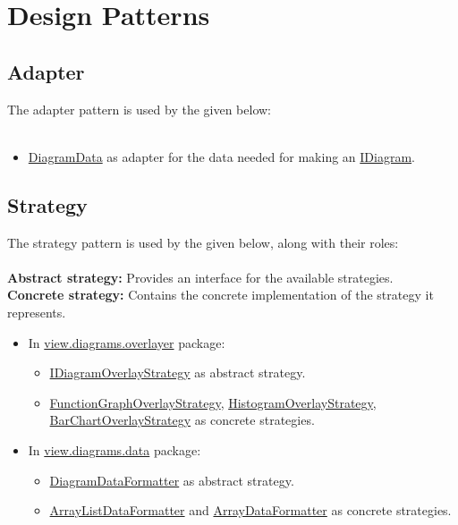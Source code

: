 \documentclass[10pt,a4paper]{report}
\newcommand{\refer}[2]{\hyperref[#1]{\textcolor{col:reference}{#2}}}
\newcommand{\packagebeginning}{edu.kit.informatik.pse.gelf} %
\newcommand{\lblroot}{lbl} %
\newcommand{\lblpackage}{} %
\newcommand{\lblpackageelement}{} %
\newcommand{\lblpackageelementmember}{} %
\newcommand{\lblpackageelementmemberparameter}{} %
\newcommand{\casclabelname}{\lblroot\lblpackage\lblpackageelement\lblpackageelementmember\lblpackageelementmemberparameter}
\newcommand{\casclabel}{\label{\casclabelname}}
\newcommand{\patternentry}[2]{
    #1{#2}
}
\newcommand{\pattern}[2]{
    \patternentry{\section}{#1}
    {#2}
}
\begin{document}
\chapter{Design Patterns}
\pattern{Adapter}{
    The adapter pattern is used by the given below:
    \leavevmode \\ \leavevmode \\
    \begin{itemize}
        \item \refer{\lblroot:view.diagrams.data:DiagramData}{DiagramData} as adapter for the data needed for making an \refer{\lblroot:view.diagrams:IDiagram}{IDiagram}.
    \end{itemize}
}
\pattern{Strategy}{
    The strategy pattern is used by the given below, along with their roles:
    \leavevmode \\ \leavevmode \\
    \textbf{Abstract strategy:} Provides an interface for the available strategies. \leavevmode \\
    \textbf{Concrete strategy:} Contains the concrete implementation of the strategy it represents. \leavevmode \\
    \begin{itemize}
        \item In \refer{\lblroot:view.diagrams.overlayer}{view.diagrams.overlayer} package:
        \begin{itemize}
            \item \refer{\lblroot:view.diagrams.overlayer:IDiagramOverlayStrategy}{IDiagramOverlayStrategy} as abstract strategy.
            \item \refer{\lblroot:view.diagrams.overlayer:FunctionGraphOverlayStrategy}{FunctionGraphOverlayStrategy}, \refer{\lblroot:view.diagrams.overlayer:HistogramOverlayStrategy}{HistogramOverlayStrategy}, \refer{\lblroot:view.diagrams.overlayer:BarChartOverlayStrategy}{BarChartOverlayStrategy} as concrete strategies.
        \end{itemize}
        \item In \refer{\lblroot:view.diagrams.data}{view.diagrams.data} package:
        \begin{itemize}
            \item \refer{\lblroot:view.diagrams.data:DiagramDataFormatter}{DiagramDataFormatter} as abstract strategy.
            \item \refer{\lblroot:view.diagrams.data:ArrayListDataFormatter}{ArrayListDataFormatter} and \refer{\lblroot:view.diagrams.data:ArrayDataFormatter}{ArrayDataFormatter} as concrete strategies.
        \end{itemize}
    \end{itemize}
}
\end{document}
